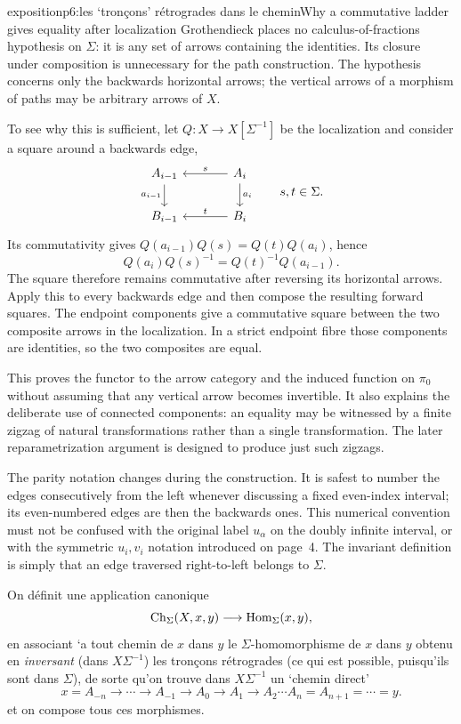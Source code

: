 \begin{dcomment}{exposition}{p6:les `tronçons' rétrogrades dans le chemin}{Why a commutative ladder gives equality after localization}
Grothendieck places no calculus-of-fractions hypothesis on $\Sigma$: it is any set of arrows containing the identities. Its closure under composition is unnecessary for the path construction. The hypothesis concerns only the backwards horizontal arrows; the vertical arrows of a morphism of paths may be arbitrary arrows of $X$.

To see why this is sufficient, let $Q:X\to X[\Sigma^{-1}]$ be the localization and consider a square around a backwards edge,
\[
\begin{tikzcd}[column sep=large]
 A_{i-1}\arrow[d,"a_{i-1}"'] & A_i\arrow[l,"s"']\arrow[d,"a_i"]\\
 B_{i-1} & B_i\arrow[l,"t"']
\end{tikzcd}
\qquad s,t\in\Sigma.
\]
Its commutativity gives $Q(a_{i-1})Q(s)=Q(t)Q(a_i)$, hence
\[
 Q(a_i)Q(s)^{-1}=Q(t)^{-1}Q(a_{i-1}).
\]
The square therefore remains commutative after reversing its horizontal arrows. Apply this to every backwards edge and then compose the resulting forward squares. The endpoint components give a commutative square between the two composite arrows in the localization. In a strict endpoint fibre those components are identities, so the two composites are equal.

This proves the functor to the arrow category and the induced function on $\pi_0$ without assuming that any vertical arrow becomes invertible. It also explains the deliberate use of connected components: an equality may be witnessed by a finite zigzag of natural transformations rather than a single transformation. The later reparametrization argument is designed to produce just such zigzags.

The parity notation changes during the construction. It is safest to number the edges consecutively from the left whenever discussing a fixed even-index interval; its even-numbered edges are then the backwards ones. This numerical convention must not be confused with the original label $u_\alpha$ on the doubly infinite interval, or with the symmetric $u_i,v_i$ notation introduced on page~4. The invariant definition is simply that an edge traversed right-to-left belongs to $\Sigma$.
\end{dcomment}


On définit une application canonique
\[
\mathrm{Ch}_\Sigma(X,x,y)\longrightarrow\mathrm{Hom}_\Sigma(x,y),
\]
en associant `a tout chemin de $x$ dans $y$ le $\Sigma$-homomorphisme de $x$ dans $y$ obtenu en \textit{inversant} (dans $X\Sigma^{-1}$) les tronçons rétrogrades (ce qui est possible, puisqu'ils sont dans $\Sigma$), de sorte qu'on trouve dans $X\Sigma^{-1}$ un `chemin direct' %
\[
x=A_{-n}\longrightarrow\cdots\longrightarrow A_{-1}\longrightarrow A_0\longrightarrow A_1\longrightarrow A_2\cdots A_n=A_{n+1}=\cdots=y.
\]
et on compose tous ces morphismes.


